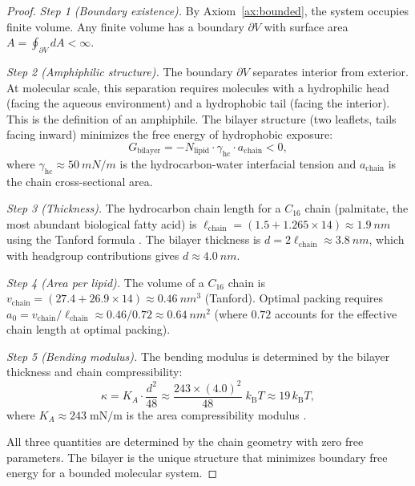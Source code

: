 \documentclass[12pt]{article}
\theoremstyle{definition}
\theoremstyle{remark}
\newcommand{\kB}{k_{\mathrm{B}}}
\begin{document}
\begin{proof}
\emph{Step 1 (Boundary existence).} By Axiom~\ref{ax:bounded}, the system occupies finite volume. Any finite volume has a boundary $\partial V$ with surface area $A = \oint_{\partial V} dA < \infty$.

\emph{Step 2 (Amphiphilic structure).} The boundary $\partial V$ separates interior from exterior. At molecular scale, this separation requires molecules with a hydrophilic head (facing the aqueous environment) and a hydrophobic tail (facing the interior). This is the definition of an amphiphile. The bilayer structure (two leaflets, tails facing inward) minimizes the free energy of hydrophobic exposure:
\begin{equation}
  G_{\mathrm{bilayer}} = -N_{\mathrm{lipid}} \cdot \gamma_{\mathrm{hc}} \cdot a_{\mathrm{chain}} < 0,
  \label{eq:bilayer_energy}
\end{equation}
where $\gamma_{\mathrm{hc}} \approx \SI{50}{mN/m}$ is the hydrocarbon-water interfacial tension and $a_{\mathrm{chain}}$ is the chain cross-sectional area.

\emph{Step 3 (Thickness).} The hydrocarbon chain length for a $C_{16}$ chain (palmitate, the most abundant biological fatty acid) is $\ell_{\mathrm{chain}} = (1.5 + 1.265 \times 14) \approx \SI{1.9}{nm}$ using the Tanford formula \cite{lipowsky1995structure}. The bilayer thickness is $d = 2\ell_{\mathrm{chain}} \approx \SI{3.8}{nm}$, which with headgroup contributions gives $d \approx \SI{4.0}{nm}$.

\emph{Step 4 (Area per lipid).} The volume of a $C_{16}$ chain is $v_{\mathrm{chain}} = (27.4 + 26.9 \times 14) \approx \SI{0.46}{nm^3}$ (Tanford). Optimal packing requires $a_0 = v_{\mathrm{chain}}/\ell_{\mathrm{chain}} \approx 0.46/0.72 \approx \SI{0.64}{nm^2}$ (where $0.72$ accounts for the effective chain length at optimal packing).

\emph{Step 5 (Bending modulus).} The bending modulus is determined by the bilayer thickness and chain compressibility:
\begin{equation}
  \kappa = K_A \cdot \frac{d^2}{48} \approx \frac{243 \times (4.0)^2}{48}\; \kB T \approx 19\,\kB T,
  \label{eq:bending}
\end{equation}
where $K_A \approx 243\;\mathrm{mN/m}$ is the area compressibility modulus \cite{helfrich1973elastic}.

All three quantities are determined by the chain geometry with zero free parameters. The bilayer is the unique structure that minimizes boundary free energy for a bounded molecular system.
\end{proof}
\end{document}
